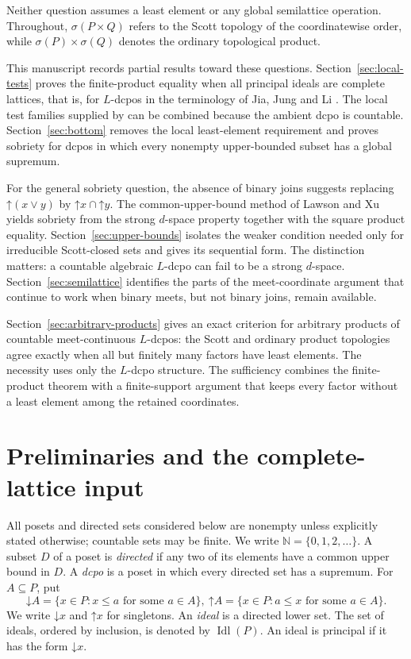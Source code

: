 \documentclass[10pt,a4paper]{amsart}
\numberwithin{equation}{section}
\newcommand{\N}{\mathbb N}
\newcommand{\down}[1]{\mathord{\downarrow}#1}
\newcommand{\up}[1]{\mathord{\uparrow}#1}
\newcommand{\Sc}{\sigma}
\newcommand{\jc}{\vee}
\newcommand{\Idl}{\operatorname{Idl}}
\begin{document}
Neither question assumes a least element or any global semilattice operation. Throughout, $\Sc(P\times Q)$ refers to the Scott topology of the coordinatewise order, while $\Sc(P)\times\Sc(Q)$ denotes the ordinary topological product.

This manuscript records partial results toward these questions. Section~\ref{sec:local-tests} proves the finite-product equality when all principal ideals are complete lattices, that is, for $L$-dcpos in the terminology of Jia, Jung and Li \cite{JiaJungLi}. The local test families supplied by \cite{XuJi} can be combined because the ambient dcpo is countable. Section~\ref{sec:bottom} removes the local least-element requirement and proves sobriety for dcpos in which every nonempty upper-bounded subset has a global supremum.

For the general sobriety question, the absence of binary joins suggests replacing $\up(x\jc y)$ by $\up x\cap\up y$. The common-upper-bound method of Lawson and Xu \cite{LawsonXu,LawsonXuLower} yields sobriety from the strong $d$-space property together with the square product equality. Section~\ref{sec:upper-bounds} isolates the weaker condition needed only for irreducible Scott-closed sets and gives its sequential form. The distinction matters: a countable algebraic $L$-dcpo can fail to be a strong $d$-space. Section~\ref{sec:semilattice} identifies the parts of the meet-coordinate argument that continue to work when binary meets, but not binary joins, remain available.

Section~\ref{sec:arbitrary-products} gives an exact criterion for arbitrary products of countable meet-continuous $L$-dcpos: the Scott and ordinary product topologies agree exactly when all but finitely many factors have least elements. The necessity uses only the $L$-dcpo structure. The sufficiency combines the finite-product theorem with a finite-support argument that keeps every factor without a least element among the retained coordinates.

\section{Preliminaries and the complete-lattice input}
All posets and directed sets considered below are nonempty unless explicitly stated otherwise; countable sets may be finite. We write $\N=\{0,1,2,\ldots\}$. A subset $D$ of a poset is \emph{directed} if any two of its elements have a common upper bound in $D$. A \emph{dcpo} is a poset in which every directed set has a supremum. For $A\subseteq P$, put
\[
 \down A=\{x\in P:x\le a\text{ for some }a\in A\},~
 \up A=\{x\in P:a\le x\text{ for some }a\in A\}.
\]
We write $\down x$ and $\up x$ for singletons. An \emph{ideal} is a directed lower set. The set of ideals, ordered by inclusion, is denoted by $\Idl(P)$. An ideal is principal if it has the form $\down x$.
\end{document}
